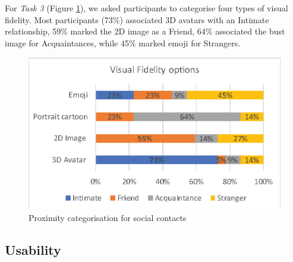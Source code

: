 For \textit{Task 3} 
(Figure \ref{fig:contacts:proximity}), we asked participants to categorise four types of visual fidelity. Most participants (73\%) associated 3D avatars with an Intimate relationship, 59\% marked the 2D image as a  Friend, 64\% associated the bust image for Acquaintances, while 45\% marked emoji for Strangers.




\begin{figure}[ht]
    \centering
    \includegraphics[width=0.8\linewidth]{images/mgia17/analysis-images-01.eps}
    \caption{Proximity categorisation for social contacts}
    \label{fig:contacts:proximity}
\end{figure}

\subsection{Usability}

